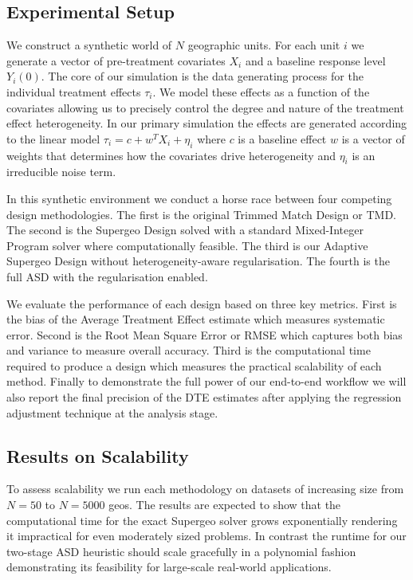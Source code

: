 \documentclass[final,3p,fleqn, 10pt]{elsarticle}
\begin{document}
    \subsection{Experimental Setup}
    We construct a synthetic world of $N$ geographic units. For each unit $i$ we generate a vector of pre-treatment covariates $X_i$ and a baseline response level $Y_i(0)$. The core of our simulation is the data generating process for the individual treatment effects $\tau_i$. We model these effects as a function of the covariates allowing us to precisely control the degree and nature of the treatment effect heterogeneity. In our primary simulation the effects are generated according to the linear model $\tau_i = c + w^T X_i + \eta_i$ where $c$ is a baseline effect $w$ is a vector of weights that determines how the covariates drive heterogeneity and $\eta_i$ is an irreducible noise term.

    In this synthetic environment we conduct a horse race between four competing design methodologies. The first is the original Trimmed Match Design or TMD. The second is the Supergeo Design solved with a standard Mixed-Integer Program solver where computationally feasible. The third is our Adaptive Supergeo Design without heterogeneity-aware regularisation. The fourth is the full ASD with the regularisation enabled.

    We evaluate the performance of each design based on three key metrics. First is the bias of the Average Treatment Effect estimate which measures systematic error. Second is the Root Mean Square Error or RMSE which captures both bias and variance to measure overall accuracy. Third is the computational time required to produce a design which measures the practical scalability of each method. Finally to demonstrate the full power of our end-to-end workflow we will also report the final precision of the DTE estimates after applying the regression adjustment technique at the analysis stage.

    \subsection{Results on Scalability}
    To assess scalability we run each methodology on datasets of increasing size from $N=50$ to $N=5000$ geos. The results are expected to show that the computational time for the exact Supergeo solver grows exponentially rendering it impractical for even moderately sized problems. In contrast the runtime for our two-stage ASD heuristic should scale gracefully in a polynomial fashion demonstrating its feasibility for large-scale real-world applications.
\end{document}
